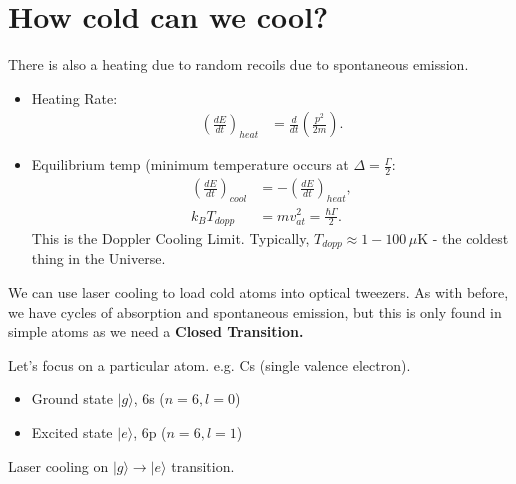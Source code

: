 \documentclass[lasers.tex]{subfiles}
\begin{document}
\section{How cold can we cool?}
There is also a heating due to random recoils due to spontaneous emission. 
\begin{figure}[H]
    \centering
\end{figure}
\begin{itemize}
    \item Heating Rate:
        \begin{align}
            \left(\frac{dE}{dt}\right)_{heat} &= \frac{d}{dt}\left(\frac{p^2}{2m}\right).
        \end{align}
    \item Equilibrium temp (minimum temperature occurs at $\Delta=\frac{\Gamma}{2}$:
        \begin{align}
            \left(\frac{dE}{dt}\right)_{cool} &= -\left(\frac{dE}{dt}\right)_{heat}, \\
            k_BT_{dopp} &= mv^2_{at} = \frac{\hbar\Gamma}{2}.
        \end{align}
        This is the Doppler Cooling Limit. 
        Typically, $T_{dopp}\approx1-100\,\mu$K - the coldest thing in the Universe. 
\end{itemize}
We can use laser cooling to load cold atoms into optical tweezers. 
As with before, we have cycles of absorption and spontaneous emission, but this is only found in simple atoms as we need a \textbf{Closed Transition.}

Let's focus on a particular atom. e.g. Cs (single valence electron).
\begin{itemize}
    \item Ground state $|g\rangle$, 6s ($n=6,l=0$)
    \item Excited state $|e\rangle$, 6p ($n=6,l=1$)
\end{itemize}   
Laser cooling on $|g\rangle\to|e\rangle$ transition. 
\end{document}
